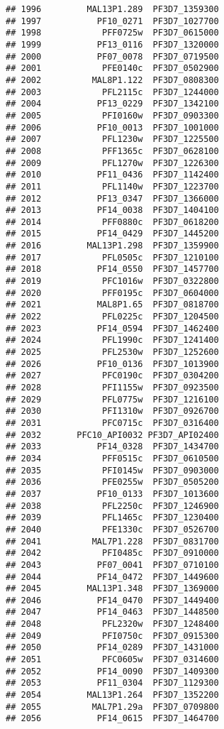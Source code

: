 \documentclass{article}\usepackage[]{graphicx}\usepackage[]{color}
\makeatletter
\newenvironment{kframe}{%
 \def\at@end@of@kframe{}%
 \ifinner\ifhmode%
  \def\at@end@of@kframe{\end{minipage}}%
  \begin{minipage}{\columnwidth}%
 \fi\fi%
 \def\FrameCommand##1{\hskip\@totalleftmargin \hskip-\fboxsep
 \colorbox{shadecolor}{##1}\hskip-\fboxsep
     \hskip-\linewidth \hskip-\@totalleftmargin \hskip\columnwidth}%
 \MakeFramed {\advance\hsize-\width
   \@totalleftmargin\z@ \linewidth\hsize
   \@setminipage}}%
 {\par\unskip\endMakeFramed%
 \at@end@of@kframe}
\newenvironment{knitrout}{}{} %
\makeatother
\begin{document}
\begin{knitrout}
\begin{kframe}
\begin{verbatim}
## 1996         MAL13P1.289  PF3D7_1359300
## 1997           PF10_0271  PF3D7_1027700
## 1998            PFF0725w  PF3D7_0615000
## 1999           PF13_0116  PF3D7_1320000
## 2000           PF07_0078  PF3D7_0719500
## 2001            PFE0140c  PF3D7_0502900
## 2002          MAL8P1.122  PF3D7_0808300
## 2003            PFL2115c  PF3D7_1244000
## 2004           PF13_0229  PF3D7_1342100
## 2005            PFI0160w  PF3D7_0903300
## 2006           PF10_0013  PF3D7_1001000
## 2007            PFL1230w  PF3D7_1225500
## 2008            PFF1365c  PF3D7_0628100
## 2009            PFL1270w  PF3D7_1226300
## 2010           PF11_0436  PF3D7_1142400
## 2011            PFL1140w  PF3D7_1223700
## 2012           PF13_0347  PF3D7_1366000
## 2013           PF14_0038  PF3D7_1404100
## 2014            PFF0880c  PF3D7_0618200
## 2015           PF14_0429  PF3D7_1445200
## 2016         MAL13P1.298  PF3D7_1359900
## 2017            PFL0505c  PF3D7_1210100
## 2018           PF14_0550  PF3D7_1457700
## 2019            PFC1016w  PF3D7_0322800
## 2020            PFF0195c  PF3D7_0604000
## 2021           MAL8P1.65  PF3D7_0818700
## 2022            PFL0225c  PF3D7_1204500
## 2023           PF14_0594  PF3D7_1462400
## 2024            PFL1990c  PF3D7_1241400
## 2025            PFL2530w  PF3D7_1252600
## 2026           PF10_0136  PF3D7_1013900
## 2027            PFC0190c  PF3D7_0304200
## 2028            PFI1155w  PF3D7_0923500
## 2029            PFL0775w  PF3D7_1216100
## 2030            PFI1310w  PF3D7_0926700
## 2031            PFC0715c  PF3D7_0316400
## 2032       PFC10_API0032 PF3D7_API02400
## 2033           PF14_0328  PF3D7_1434700
## 2034            PFF0515c  PF3D7_0610500
## 2035            PFI0145w  PF3D7_0903000
## 2036            PFE0255w  PF3D7_0505200
## 2037           PF10_0133  PF3D7_1013600
## 2038            PFL2250c  PF3D7_1246900
## 2039            PFL1465c  PF3D7_1230400
## 2040            PFE1330c  PF3D7_0526700
## 2041          MAL7P1.228  PF3D7_0831700
## 2042            PFI0485c  PF3D7_0910000
## 2043           PF07_0041  PF3D7_0710100
## 2044           PF14_0472  PF3D7_1449600
## 2045         MAL13P1.348  PF3D7_1369000
## 2046           PF14_0470  PF3D7_1449400
## 2047           PF14_0463  PF3D7_1448500
## 2048            PFL2320w  PF3D7_1248400
## 2049            PFI0750c  PF3D7_0915300
## 2050           PF14_0289  PF3D7_1431000
## 2051            PFC0605w  PF3D7_0314600
## 2052           PF14_0090  PF3D7_1409300
## 2053           PF11_0304  PF3D7_1129300
## 2054         MAL13P1.264  PF3D7_1352200
## 2055          MAL7P1.29a  PF3D7_0709800
## 2056           PF14_0615  PF3D7_1464700

\end{verbatim}
\end{kframe}
\end{knitrout}
\end{document}
